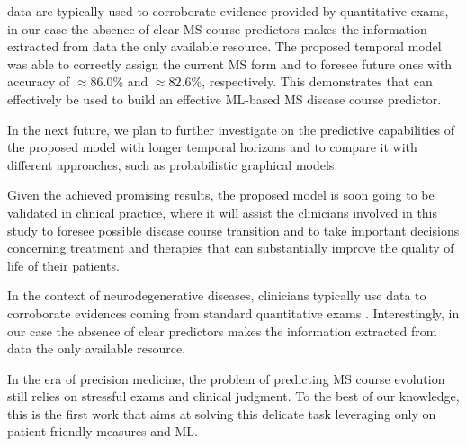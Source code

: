 \PCOs data are typically used to corroborate evidence provided by quantitative exams, in our case the absence of clear MS course predictors makes the information extracted from \PCOs data the only available resource.
The proposed temporal model was able to correctly assign the current MS form and to foresee future ones with accuracy of $\approx 86.0\%$ and $\approx 82.6\%$, respectively.
This demonstrates that \PCOs can effectively be used to build an effective ML-based MS disease course predictor.

In the next future, we plan to further investigate on the predictive capabilities of the proposed model with longer temporal horizons and to compare it with different approaches, such as probabilistic graphical models.

Given the achieved promising results, the proposed model is soon going to be validated in clinical practice, where it will assist the clinicians involved in this study to foresee possible disease course transition and to take important decisions concerning treatment and therapies that can substantially improve the quality of life of their patients.

In the context of neurodegenerative diseases, clinicians typically use \PCOs data to corroborate evidences coming from standard quantitative exams \cite{black2013patient}. Interestingly, in our case the absence of clear \SP predictors makes the information extracted from \PCOs data the only available resource.

In the era of precision medicine, the problem of predicting MS course evolution still relies on stressful exams and clinical judgment.
To the best of our knowledge, this is the first work that aims at solving this delicate task leveraging only on patient-friendly measures and ML.